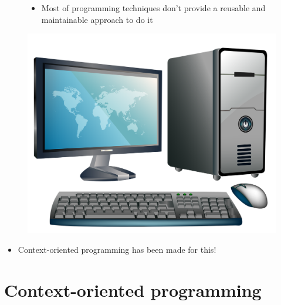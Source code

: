 \documentclass{beamer}
\begin{document}
\begin{frame}
	\begin{figure}[!ht]
		\begin{minipage}{\linewidth}
			\begin{minipage}{0.7\linewidth}
				\begin{itemize}
					\item Most of programming techniques don't provide a reusable
					and maintainable approach to do it
				\end{itemize}
			\end{minipage}
			\begin{minipage}{0.25\linewidth}
				\includegraphics[width=0.6\linewidth]{computer.png}
			\end{minipage}
		\end{minipage}
	\end{figure}

	\begin{itemize}
		\item Context-oriented programming has been made for this!
	\end{itemize}
\end{frame}

\section{Context-oriented programming}
\end{document}
